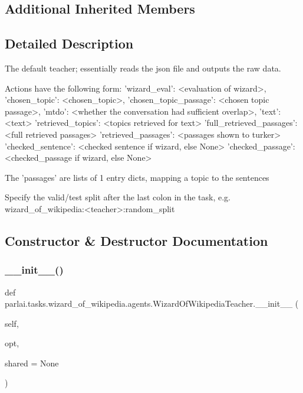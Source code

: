 \subsection*{Additional Inherited Members}


\subsection{Detailed Description}
\begin{DoxyVerb}The default teacher; essentially reads the json file and outputs the raw data.

Actions have the following form:
{
    'wizard_eval': <evaluation of wizard>,
    'chosen_topic': <chosen_topic>,
    'chosen_topic_passage': <chosen topic passage>,
    'mtdo': <whether the conversation had sufficient overlap>,
    'text': <text>
    'retrieved_topics': <topics retrieved for text>
    'full_retrieved_passages': <full retrieved passages>
    'retrieved_passages': <passages shown to turker>
    'checked_sentence': <checked sentence if wizard, else None>
    'checked_passage': <checked_passage if wizard, else None>
}

The 'passages' are lists of 1 entry dicts, mapping a topic to the sentences

Specify the valid/test split after the last colon in the task, e.g.
wizard_of_wikipedia:<teacher>:random_split
\end{DoxyVerb}
 

\subsection{Constructor \& Destructor Documentation}
\mbox{\label{classparlai_1_1tasks_1_1wizard__of__wikipedia_1_1agents_1_1WizardOfWikipediaTeacher_a364b2b8db4fd8162bd72d29fe4001d90}} 
\subsubsection{\texorpdfstring{\+\_\+\+\_\+init\+\_\+\+\_\+()}{\_\_init\_\_()}}
{\footnotesize\ttfamily def parlai.\+tasks.\+wizard\+\_\+of\+\_\+wikipedia.\+agents.\+Wizard\+Of\+Wikipedia\+Teacher.\+\_\+\+\_\+init\+\_\+\+\_\+ (\begin{DoxyParamCaption}\item[{}]{self,  }\item[{}]{opt,  }\item[{}]{shared = {\ttfamily None} }\end{DoxyParamCaption})}



